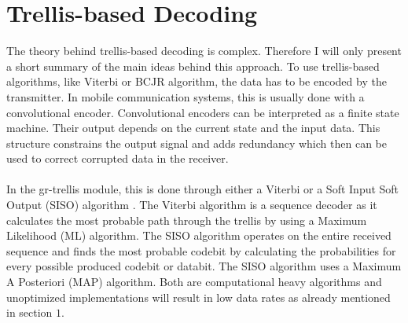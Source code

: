 \documentclass[11pt,		%
	    DIV12,		%
	    a4paper,		%
	    final,		%
	    halfparskip,	%
	    ]{scrartcl}		%
\begin{document}
\section{Trellis-based Decoding}
The theory behind trellis-based decoding is complex. Therefore I will only present a short summary of the main ideas behind this approach. To use trellis-based algorithms, like Viterbi or BCJR algorithm, the data has to be encoded by the transmitter. In mobile communication systems, this is usually done with a convolutional encoder. Convolutional encoders can be interpreted as a finite state machine. Their output depends on the current state and the input data. This structure constrains the output signal and adds redundancy which then can be used to correct corrupted data in the receiver. \\ \\In the gr-trellis module, this is done through either a Viterbi or a Soft Input Soft Output (SISO) algorithm \cite{gnrDoc}. The Viterbi algorithm is a sequence decoder as it calculates the most probable path through the trellis by using a Maximum Likelihood (ML) algorithm. The SISO algorithm operates on the entire received sequence and finds the most probable codebit by calculating the probabilities for every possible produced codebit or databit. The SISO algorithm uses a Maximum A Posteriori (MAP) algorithm. Both are computational heavy algorithms and unoptimized implementations will result in low data rates as already mentioned in section $1$. 
\end{document}
